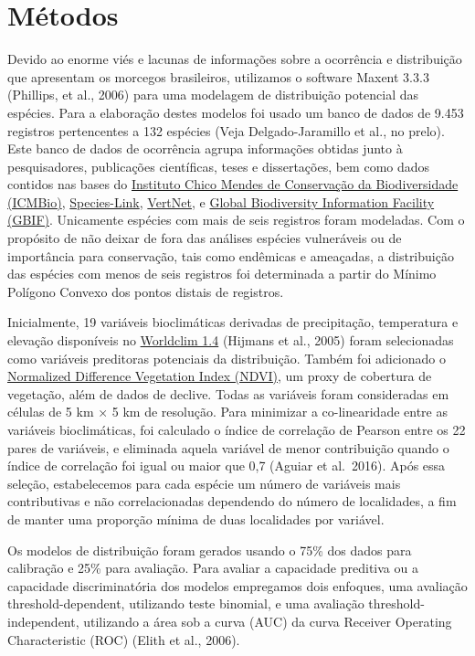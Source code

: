 \documentclass[
]{scrbook}
\begin{document}
\hypertarget{metodos-morcegos}{%
\section{Métodos}\label{metodos-morcegos}}

Devido ao enorme viés e lacunas de informações sobre a ocorrência e distribuição que apresentam os morcegos brasileiros, utilizamos o software Maxent 3.3.3 (Phillips, et al., 2006) para uma modelagem de distribuição potencial das espécies. Para a elaboração destes modelos foi usado um banco de dados de 9.453 registros pertencentes a 132 espécies (Veja Delgado-Jaramillo et al., no prelo). Este banco de dados de ocorrência agrupa informações obtidas junto à pesquisadores, publicações científicas, teses e dissertações, bem como dados contidos nas bases do \href{http://www.icmbio.gov.br}{Instituto Chico Mendes de Conservação da Biodiversidade (ICMBio)}, \href{http://www.splink.org.br}{Species-Link}, \href{http://www.vertnet.org}{VertNet}, e \href{http://www.gbif.org}{Global Biodiversity Information Facility (GBIF)}. Unicamente espécies com mais de seis registros foram modeladas. Com o propósito de não deixar de fora das análises espécies vulneráveis ou de importância para conservação, tais como endêmicas e ameaçadas, a distribuição das espécies com menos de seis registros foi determinada a partir do Mínimo Polígono Convexo dos pontos distais de registros.

Inicialmente, 19 variáveis bioclimáticas derivadas de precipitação, temperatura e elevação disponíveis no \href{http://www.worldclim.org}{Worldclim 1.4} (Hijmans et al., 2005) foram selecionadas como variáveis preditoras potenciais da distribuição. Também foi adicionado o \href{http://glcf.umd.edu/data/ndvi/}{Normalized Difference Vegetation Index (NDVI)}, um proxy de cobertura de vegetação, além de dados de declive. Todas as variáveis foram consideradas em células de 5 km × 5 km de resolução. Para minimizar a co-linearidade entre as variáveis bioclimáticas, foi calculado o índice de correlação de Pearson entre os 22 pares de variáveis, e eliminada aquela variável de menor contribuição quando o índice de correlação foi igual ou maior que 0,7 (Aguiar et al.~2016). Após essa seleção, estabelecemos para cada espécie um número de variáveis mais contributivas e não correlacionadas dependendo do número de localidades, a fim de manter uma proporção mínima de duas localidades por variável.

Os modelos de distribuição foram gerados usando o 75\% dos dados para calibração e 25\% para avaliação. Para avaliar a capacidade preditiva ou a capacidade discriminatória dos modelos empregamos dois enfoques, uma avaliação threshold-dependent, utilizando teste binomial, e uma avaliação threshold-independent, utilizando a área sob a curva (AUC) da curva Receiver Operating Characteristic (ROC) (Elith et al., 2006).
\end{document}

